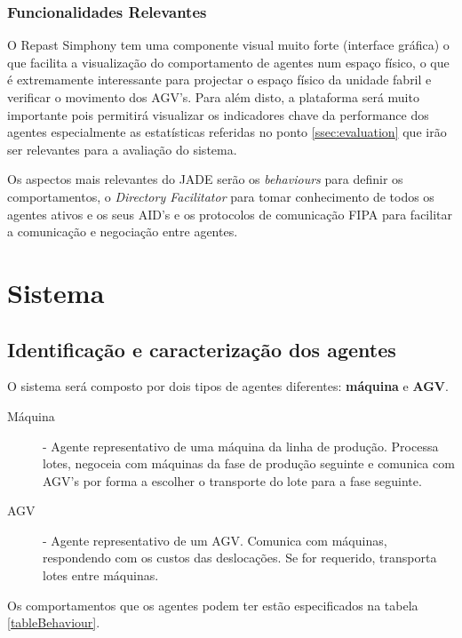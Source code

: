 \begin{titlepage}
\subsubsection{Funcionalidades Relevantes}

O Repast Simphony tem uma componente visual muito forte (interface gráfica) o que facilita a visualização do comportamento de agentes num espaço físico, o que é extremamente interessante para projectar o espaço físico da unidade fabril e verificar o movimento dos AGV's. Para além disto, a plataforma será muito importante pois permitirá visualizar os indicadores chave da performance dos agentes especialmente as estatísticas referidas no ponto \ref{ssec:evaluation} que irão ser relevantes para a avaliação do sistema.

Os aspectos mais relevantes do JADE serão os \textit{behaviours} para definir os comportamentos, o \textit{Directory Facilitator} para tomar conhecimento de todos os agentes ativos e os seus AID's e os protocolos de comunicação FIPA para facilitar a comunicação e negociação entre agentes.



\section{Sistema}

\subsection{Identificação e caracterização dos agentes}
O sistema será composto por dois tipos de agentes diferentes: \textbf{máquina} e \textbf{AGV}.

\begin{description}
\item[Máquina] - Agente representativo de uma máquina da linha de produção. Processa lotes, negoceia com máquinas da fase de produção seguinte e comunica com AGV's por forma a escolher o transporte do lote para a fase seguinte.
\item[AGV] - Agente representativo de um AGV. Comunica com máquinas, respondendo com os custos das deslocações. Se for requerido, transporta lotes entre máquinas.
\end{description}

Os comportamentos que os agentes podem ter estão especificados na tabela \ref{tableBehaviour}.


\end{titlepage}
